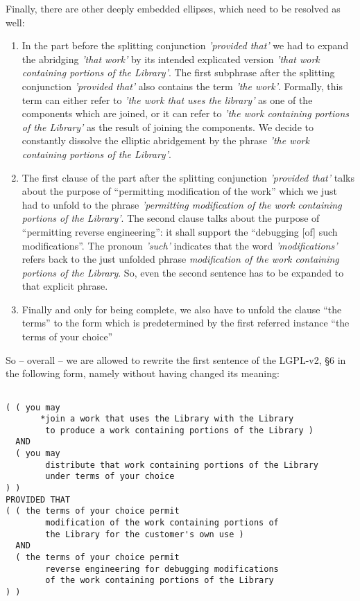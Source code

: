 Finally, there are other deeply embedded ellipses, which need to be resolved
as well:

\begin{enumerate}
  \item  In the part before the splitting conjunction \emph{'provided that'} we
  had to expand the abridging \emph{'that work'} by its intended explicated
  version \emph{'that work containing portions of the Library'}. The first
  subphrase after the splitting conjunction \emph{'provided that'} also contains
  the term \emph{'the work'}. Formally, this term can either refer to \emph{'the
  work that uses the library'} as one of the components which are joined, or it
  can refer to \emph{'the work containing portions of the Library'} as the
  result of joining the components. We decide to constantly dissolve the
  elliptic abridgement by the phrase \emph{'the work containing portions of the
  Library'}.
  \item The first clause of the part after the splitting conjunction
  \emph{'provided that'} talks about the purpose of \enquote{permitting
  modification of the work} which we just had to unfold to the phrase
  \emph{'permitting modification of the work containing portions of the
  Library'}. The second clause talks about the purpose of \enquote{permitting
  reverse engineering}: it shall support the \enquote{debugging [of] such
  modifications}. The pronoun \emph{'such'} indicates that the word
  \emph{'modifications'} refers back to the just unfolded phrase
  \emph{modification of the work containing portions of the Library}. So, even
  the second sentence has to be expanded to that explicit phrase.
  \item Finally and only for being complete, we also have to unfold the clause
  \enquote{the terms} to the form which is predetermined by the first referred
  instance \enquote{the terms of your choice}
\end{enumerate}

So -- overall -- we are allowed to rewrite the first sentence of the LGPL-v2, §6
in the following form, namely without having changed its meaning:

\begin{verbatim}

( ( you may 
       *join a work that uses the Library with the Library
        to produce a work containing portions of the Library )
  AND 
  ( you may 
        distribute that work containing portions of the Library
        under terms of your choice 
) )
PROVIDED THAT
( ( the terms of your choice permit 
        modification of the work containing portions of 
        the Library for the customer's own use )
  AND
  ( the terms of your choice permit
        reverse engineering for debugging modifications 
        of the work containing portions of the Library   
) )
\end{verbatim}

